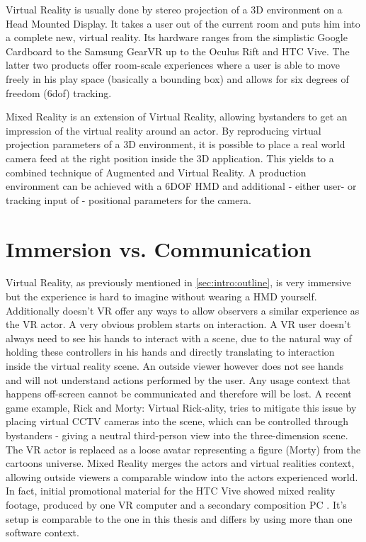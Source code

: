 Virtual Reality is usually done by stereo projection of a 3D environment on a 
Head Mounted Display. It takes a user out of the current room and puts him into 
a complete new, virtual reality. Its hardware ranges from the simplistic Google 
Cardboard to the Samsung GearVR up to the Oculus Rift and HTC Vive. The latter 
two products offer room-scale experiences where a user is able to move freely 
in his play space (basically a bounding box) and allows for six degrees of 
freedom (\gls{6dof}) tracking.

Mixed Reality is an extension of Virtual Reality, allowing bystanders to get an 
impression of the virtual reality around an actor. By reproducing virtual 
projection parameters of a 3D environment, it is possible to place a real world 
camera feed at the right position inside the 3D application. This yields to a 
combined technique of Augmented and Virtual Reality. A production environment 
can be achieved with a \gls{6DOF} HMD and additional - either user- or tracking 
input of - positional parameters for the camera. 

\section{Immersion vs. Communication}


Virtual Reality, as previously mentioned in \ref{sec:intro:outline}, is very 
immersive but the experience is hard to imagine without wearing a HMD yourself. 
Additionally doesn't VR offer any ways to allow observers a similar experience 
as the VR actor.
\newline
A very obvious problem starts on interaction. A VR user doesn't always need to 
see his hands to interact with a scene, due to the natural way of holding these 
controllers in his hands and directly translating to interaction inside the 
virtual reality scene. An outside viewer however does not see hands and will 
not understand actions performed by the user. Any usage context that happens 
off-screen cannot be communicated and therefore will be lost.
\newline
A recent game example, Rick and Morty: Virtual Rick-ality, tries to mitigate 
this issue by placing virtual CCTV cameras into the scene, which can be 
controlled through bystanders - giving a neutral third-person view into the 
three-dimension scene. The VR actor is replaced as a loose avatar representing 
a figure (Morty) from the cartoons universe.
\newline
Mixed Reality merges the actors and virtual realities context, allowing outside 
viewers a comparable window into the actors experienced world. In fact, initial 
promotional material for the HTC Vive showed mixed reality footage, produced by 
one VR computer and a secondary composition PC \cite{valve:mr-production:2016}. 
It's setup is comparable to the 
one in this thesis and differs by using more than one software context.

